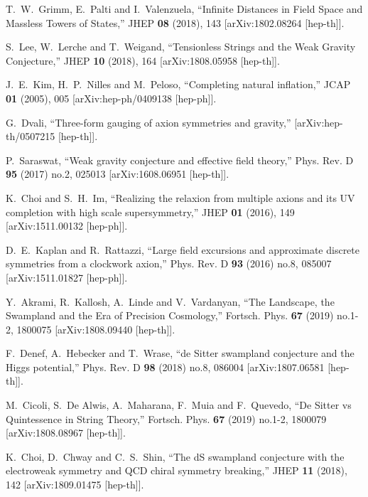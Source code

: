 \documentclass[12pt]{article}
\numberwithin{equation}{section}
\begin{document}
\begin{thebibliography}{999}
T.~W.~Grimm, E.~Palti and I.~Valenzuela,
``Infinite Distances in Field Space and Massless Towers of States,''
JHEP \textbf{08} (2018), 143
[arXiv:1802.08264 [hep-th]].

S.~Lee, W.~Lerche and T.~Weigand,
``Tensionless Strings and the Weak Gravity Conjecture,''
JHEP \textbf{10} (2018), 164
[arXiv:1808.05958 [hep-th]].

J.~E.~Kim, H.~P.~Nilles and M.~Peloso,
``Completing natural inflation,''
JCAP \textbf{01} (2005), 005
[arXiv:hep-ph/0409138 [hep-ph]].

G.~Dvali,
``Three-form gauging of axion symmetries and gravity,''
[arXiv:hep-th/0507215 [hep-th]].

P.~Saraswat,
``Weak gravity conjecture and effective field theory,''
Phys. Rev. D \textbf{95} (2017) no.2, 025013
[arXiv:1608.06951 [hep-th]].

K.~Choi and S.~H.~Im,
``Realizing the relaxion from multiple axions and its UV completion with high scale supersymmetry,''
JHEP \textbf{01} (2016), 149
[arXiv:1511.00132 [hep-ph]].

D.~E.~Kaplan and R.~Rattazzi,
``Large field excursions and approximate discrete symmetries from a clockwork axion,''
Phys. Rev. D \textbf{93} (2016) no.8, 085007
[arXiv:1511.01827 [hep-ph]].

Y.~Akrami, R.~Kallosh, A.~Linde and V.~Vardanyan,
``The Landscape, the Swampland and the Era of Precision Cosmology,''
Fortsch. Phys. \textbf{67} (2019) no.1-2, 1800075
[arXiv:1808.09440 [hep-th]].

F.~Denef, A.~Hebecker and T.~Wrase,
``de Sitter swampland conjecture and the Higgs potential,''
Phys. Rev. D \textbf{98} (2018) no.8, 086004
[arXiv:1807.06581 [hep-th]].

M.~Cicoli, S.~De Alwis, A.~Maharana, F.~Muia and F.~Quevedo,
``De Sitter vs Quintessence in String Theory,''
Fortsch. Phys. \textbf{67} (2019) no.1-2, 1800079
[arXiv:1808.08967 [hep-th]].

K.~Choi, D.~Chway and C.~S.~Shin,
``The dS swampland conjecture with the electroweak symmetry and QCD chiral symmetry breaking,''
JHEP \textbf{11} (2018), 142
[arXiv:1809.01475 [hep-th]].


\end{thebibliography}
\end{document}

